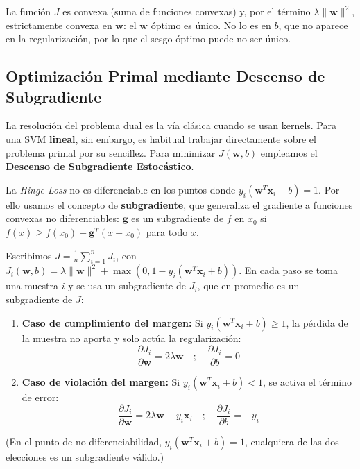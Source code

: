 \documentclass[12pt, a4paper]{article}
\begin{document}
\noindent La función $J$ es convexa (suma de funciones convexas) y, por el término $\lambda\|\mathbf{w}\|^2$, estrictamente convexa en $\mathbf{w}$: el $\mathbf{w}$ óptimo es único. No lo es en $b$, que no aparece en la regularización, por lo que el sesgo óptimo puede no ser único.

\subsection{Optimización Primal mediante Descenso de Subgradiente}

\noindent La resolución del problema dual es la vía clásica cuando se usan kernels. Para una SVM \textbf{lineal}, sin embargo, es habitual trabajar directamente sobre el problema primal por su sencillez. Para minimizar $J(\mathbf{w}, b)$ empleamos el \textbf{Descenso de Subgradiente Estocástico}.

\noindent La \textit{Hinge Loss} no es diferenciable en los puntos donde $y_i(\mathbf{w}^T \mathbf{x}_i + b) = 1$. Por ello usamos el concepto de \textbf{subgradiente}, que generaliza el gradiente a funciones convexas no diferenciables: $\mathbf{g}$ es un subgradiente de $f$ en $x_0$ si $f(x) \geq f(x_0) + \mathbf{g}^T(x - x_0)$ para todo $x$.

\noindent Escribimos $J = \frac{1}{n}\sum_{i=1}^n J_i$, con $J_i(\mathbf{w}, b) = \lambda\|\mathbf{w}\|^2 + \max(0, 1 - y_i(\mathbf{w}^T \mathbf{x}_i + b))$. En cada paso se toma una muestra $i$ y se usa un subgradiente de $J_i$, que en promedio es un subgradiente de $J$:

\begin{enumerate}
    \item \textbf{Caso de cumplimiento del margen:}
    Si $y_i(\mathbf{w}^T \mathbf{x}_i + b) \geq 1$, la pérdida de la muestra no aporta y solo actúa la regularización:
    \[ \frac{\partial J_i}{\partial \mathbf{w}} = 2\lambda \mathbf{w} \quad ; \quad \frac{\partial J_i}{\partial b} = 0 \]

    \item \textbf{Caso de violación del margen:}
    Si $y_i(\mathbf{w}^T \mathbf{x}_i + b) < 1$, se activa el término de error:
    \[ \frac{\partial J_i}{\partial \mathbf{w}} = 2\lambda \mathbf{w} - y_i \mathbf{x}_i \quad ; \quad \frac{\partial J_i}{\partial b} = -y_i \]
\end{enumerate}
(En el punto de no diferenciabilidad, $y_i(\mathbf{w}^T \mathbf{x}_i + b) = 1$, cualquiera de las dos elecciones es un subgradiente válido.)
\end{document}
